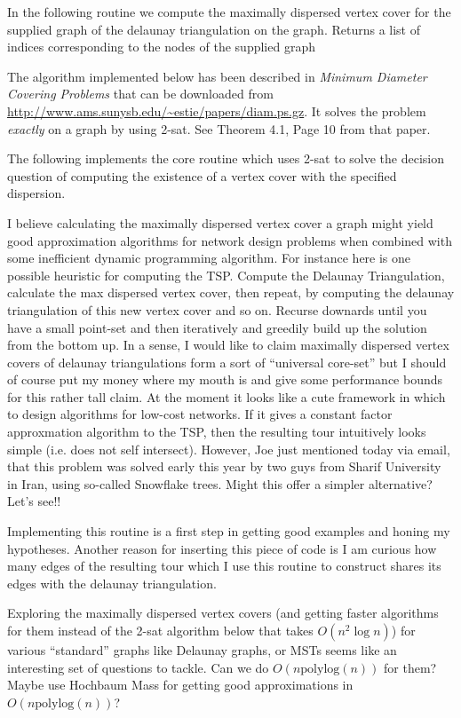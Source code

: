 In the following routine we compute the maximally dispersed vertex cover for the supplied graph of the delaunay triangulation
on the graph. Returns a list of indices corresponding to the nodes of the supplied graph

The algorithm implemented below has been described in \textit{Minimum Diameter Covering Problems} that can be downloaded
from \url{http://www.ams.sunysb.edu/~estie/papers/diam.ps.gz}. It solves the problem \textit{exactly} on a graph by using
2-sat. See Theorem 4.1, Page 10 from that paper. 

The following implements the core routine which uses 2-sat to solve the decision question of 
computing the existence of a vertex cover with the specified dispersion. 

I believe calculating the maximally dispersed vertex cover a graph might yield good approximation algorithms
for network design problems when combined with some inefficient dynamic programming algorithm. For instance
here is one possible heuristic for computing the TSP. Compute the Delaunay Triangulation, calculate the 
max dispersed vertex cover, then repeat, by computing the delaunay triangulation of this new vertex cover
and so on. Recurse downards until you have a small point-set and then iteratively and greedily build up the 
solution from the bottom up. In a sense, I would like to claim maximally dispersed vertex covers
of delaunay triangulations form a sort of ``universal core-set'' but I should of course put
my money where my mouth is and give some performance bounds for this rather tall claim. At the moment 
it looks like a cute framework in which to design algorithms for low-cost networks. If it gives a constant
factor approxmation algorithm to the TSP, then the resulting tour intuitively looks simple (i.e. does not self intersect).
However, Joe just mentioned today via email, that this problem was solved early this year by two guys 
from Sharif University in Iran, using so-called Snowflake trees. Might this offer a simpler alternative? Let's see!! 

Implementing this routine is a first step in getting good examples and honing my hypotheses. Another reason for 
inserting this piece of code is I am curious how many edges of the resulting tour which I use this routine
to construct shares its edges with the delaunay triangulation. 

Exploring the maximally dispersed vertex covers (and getting faster algorithms for them instead of the 2-sat algorithm below
that takes $O(n^2 \log n)$) for various ``standard'' graphs like Delaunay graphs, or MSTs seems like an interesting set of 
questions to tackle. Can we do $O(n \text{polylog}(n))$ for them? Maybe use Hochbaum Mass for getting good approximations 
in $O(n \text{polylog}(n))$? 


